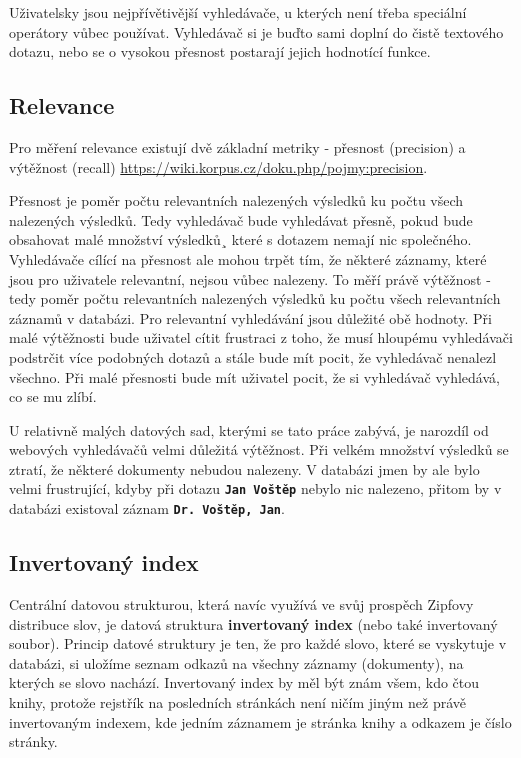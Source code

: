 \documentclass[12pt,letterpaper,oneside,openright]{book}
\newcommand{\bftt}[1]{\texttt{\textbf{#1}}}
\begin{document}
Uživatelsky jsou nejpřívětivější vyhledávače, u kterých není třeba speciální
operátory vůbec používat. Vyhledávač si je buďto sami doplní do čistě textového
dotazu, nebo se o vysokou přesnost postarají jejich hodnotící funkce.

\subsection{Relevance}
Pro měření relevance existují dvě základní metriky - přesnost (precision) a
výtěžnost (recall) \url{https://wiki.korpus.cz/doku.php/pojmy:precision}.

Přesnost je poměr počtu relevantních nalezených výsledků ku počtu všech
nalezených výsledků. Tedy vyhledávač bude vyhledávat přesně, pokud bude
obsahovat malé množství výsledků¸ které s dotazem nemají nic společného.
Vyhledávače cílící na přesnost ale mohou trpět tím, že některé záznamy, které
jsou pro uživatele relevantní, nejsou vůbec nalezeny. To měří právě výtěžnost -
tedy poměr počtu relevantních nalezených výsledků ku počtu všech relevantních
záznamů v databázi. Pro relevantní vyhledávání jsou důležité obě hodnoty. Při
malé výtěžnosti bude uživatel cítit frustraci z toho, že musí hloupému
vyhledávači podstrčit více podobných dotazů a stále bude mít pocit, že
vyhledávač nenalezl všechno. Při malé přesnosti bude mít uživatel pocit, že si
vyhledávač vyhledává, co se mu zlíbí.

U relativně malých datových sad, kterými se tato práce zabývá, je narozdíl od
webových vyhledávačů velmi důležitá výtěžnost. Při velkém množství výsledků se
ztratí, že některé dokumenty nebudou nalezeny. V databázi jmen by ale bylo
velmi frustrující, kdyby při dotazu \bftt{Jan Voštěp} nebylo nic nalezeno,
přitom by v databázi existoval záznam \bftt{Dr. Voštěp, Jan}.

\subsection{Invertovaný index}
Centrální datovou strukturou, která navíc využívá ve svůj prospěch Zipfovy
distribuce slov, je datová struktura \textbf{invertovaný index} (nebo také
invertovaný soubor). Princip datové struktury je ten, že pro každé slovo, které
se vyskytuje v databázi, si uložíme seznam odkazů na všechny záznamy
(dokumenty), na kterých se slovo nachází.  Invertovaný index by měl být znám
všem, kdo čtou knihy, protože rejstřík na posledních stránkách není ničím jiným
než právě invertovaným indexem, kde jedním záznamem je stránka knihy a odkazem
je číslo stránky.
\end{document}
